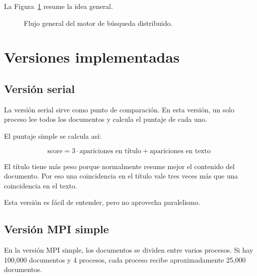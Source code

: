\documentclass[12pt,letterpaper]{article}
\begin{document}
La Figura~\ref{fig:workflow} resume la idea general.

\begin{figure}[H]
\centering
{}
\caption{Flujo general del motor de búsqueda distribuido.}
\label{fig:workflow}
\end{figure}

\section{Versiones implementadas}

\subsection{Versión serial}

La versión serial sirve como punto de comparación. En esta versión, un solo proceso lee todos los documentos y calcula el puntaje de cada uno.

El puntaje simple se calcula así:

\[
\text{score} = 3 \cdot \text{apariciones en título} + \text{apariciones en texto}
\]

El título tiene más peso porque normalmente resume mejor el contenido del documento. Por eso una coincidencia en el título vale tres veces más que una coincidencia en el texto.

Esta versión es fácil de entender, pero no aprovecha paralelismo.

\subsection{Versión MPI simple}

En la versión MPI simple, los documentos se dividen entre varios procesos. Si hay 100,000 documentos y 4 procesos, cada proceso recibe aproximadamente 25,000 documentos.
\end{document}
